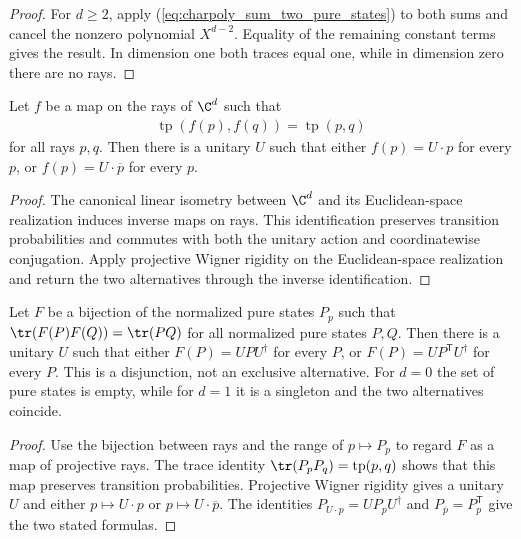 \begin{proof}\leanok
    For $d\geq2$, apply
    (\ref{eq:charpoly_sum_two_pure_states}) to both sums and cancel the nonzero
    polynomial $X^{d-2}$. Equality of the remaining constant terms gives the
    result. In dimension one both traces equal one, while in dimension zero
    there are no rays.
\end{proof}

\begin{theorem}
    \label{thm:projective_wigner_rigidity}
    \leanok
    Let $f$ be a map on the rays of $\C^d$ such that
    \begin{align}
        \operatorname{tp}(f(p),f(q))=\operatorname{tp}(p,q)
    \end{align}
    for all rays $p,q$. Then there is a unitary $U$ such that either
    $f(p)=U\cdot p$ for every $p$, or
    $f(p)=U\cdot\overline p$ for every $p$.
\end{theorem}

\begin{proof}\leanok
    The canonical linear isometry between $\C^d$ and its Euclidean-space
    realization induces inverse maps on rays. This identification preserves
    transition probabilities and commutes with both the unitary action and
    coordinatewise conjugation. Apply projective Wigner rigidity on the
    Euclidean-space realization and return the two alternatives through the
    inverse identification.
\end{proof}

\begin{theorem}\label{thm:wigner}
    \leanok
    Let $F$ be a bijection of the normalized pure states $P_p$ such that
    $\tr(F(P)F(Q))=\tr(PQ)$ for all normalized pure states $P,Q$.
    Then there is a unitary $U$ such that either
    $F(P)=UPU^\dagger$ for every $P$, or
    $F(P)=UP^{\mathsf T}U^\dagger$ for every $P$.
    This is a disjunction, not an exclusive alternative. For $d=0$ the set of
    pure states is empty, while for $d=1$ it is a singleton and the two
    alternatives coincide.
\end{theorem}

\begin{proof}\leanok
    Use the bijection between rays and the range of $p\mapsto P_p$ to regard
    $F$ as a map of projective rays. The trace identity
    $\tr(P_pP_q)=\operatorname{tp}(p,q)$ shows that this map preserves
    transition probabilities. Projective Wigner rigidity gives a unitary $U$
    and either $p\mapsto U\cdot p$ or
    $p\mapsto U\cdot\overline p$. The identities
    $P_{U\cdot p}=UP_pU^\dagger$ and
    $P_{\overline p}=P_p^{\mathsf T}$ give the two stated formulas.
\end{proof}

